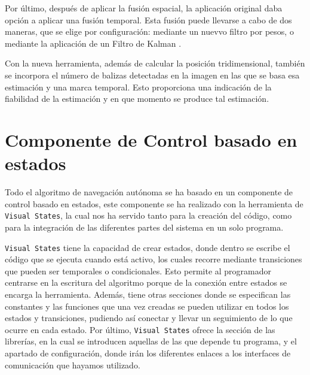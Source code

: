 \hspace{1cm} Por último, después de aplicar la fusión espacial, la aplicación original daba opción a aplicar una fusión temporal. Esta fusión puede llevarse a cabo de dos maneras, que se elige por configuración: mediante un nuevvo filtro por pesos, o mediante la aplicación de un Filtro de Kalman \cite{FiltroKalman}.

\hspace{1cm} Con la nueva herramienta, además de calcular la posición tridimensional, también se incorpora el número de balizas detectadas en la imagen en las que se basa esa estimación y una marca temporal. Esto proporciona una indicación de la fiabilidad de la
estimación y en que momento se produce tal estimación.

\section{Componente de Control basado en estados}
\hspace{1cm} Todo el algoritmo de navegación autónoma se ha basado en un componente de control basado en estados, este componente se ha realizado con la herramienta de \texttt{Visual States}, la cual nos ha servido tanto para la creación del código, como para la integración de las diferentes partes del sistema en un solo programa. 

\hspace{1cm} \texttt{Visual States} tiene la capacidad de crear estados, donde dentro se escribe el código que se ejecuta cuando está activo, los cuales recorre mediante transiciones que pueden ser temporales o condicionales. Esto permite al programador centrarse en la escritura del algoritmo porque de la conexión entre estados se encarga la herramienta. Además, tiene otras secciones donde se especifican las constantes y las funciones que una vez creadas se pueden utilizar en todos los estados y transiciones, pudiendo así conectar y llevar un seguimiento de lo que ocurre en cada estado. Por último, \texttt{Visual States} ofrece la sección de las librerías, en la cual se introducen aquellas de las que depende tu programa, y el apartado de configuración, donde irán los diferentes enlaces a los interfaces de comunicación que hayamos utilizado. 


